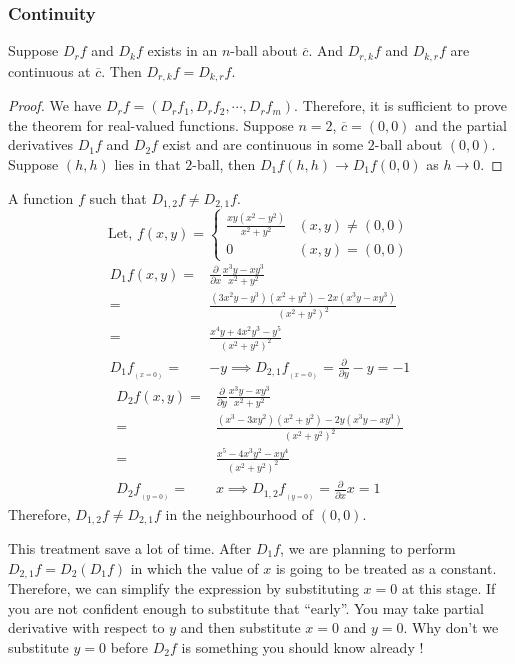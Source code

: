 \subsubsection{Continuity}
\begin{theorem}
	Suppose $D_r f$ and $D_k f$ exists in an $n$-ball about $\overline{c}$.
	And $D_{r,k} f$ and $D_{k,r} f$ are continuous at $\overline{c}$.
	Then $D_{r,k} f = D_{k,r} f$.
\end{theorem}
\begin{proof}
	We have $D_r f = (D_r f_1 , D_r f_2, \cdots, D_r f_m)$.
	Therefore, it is sufficient to prove the theorem for real-valued functions.
	Suppose $n = 2$, $\overline{c} = (0,0)$ and the partial derivatives $D_1 f$ and $D_2 f$ exist and are continuous in some $2$-ball about $(0,0)$.
	Suppose $(h,h)$ lies in that $2$-ball, then $D_1 f(h,h) \to D_1 f(0,0)$ as $h \to 0$.
\end{proof}

\begin{remark} A function $f$ such that $D_{1,2} f \ne D_{2,1} f$.
	\[ \text{Let, }f(x,y) = \begin{cases} \frac{xy(x^2-y^2)}{x^2+y^2} & (x,y) \ne (0,0) \\ 0 & (x,y) = (0,0) \end{cases} \]
	\begin{align*}
		D_1 f(x,y) = & \frac{\partial}{\partial x} \frac{x^3y-xy^3}{x^2+y^2} \\
		= & \frac{(3x^2y-y^3)(x^2+y^2) - 2x(x^3y-xy^3)}{(x^2+y^2)^2} \\
		= & \frac{x^4y+4x^2y^3-y^5}{(x^2+y^2)^2}\\
		D_1 f_{_{(x = 0)}} = & -y \implies D_{2,1} f_{_{(x = 0)}} = \frac{\partial}{\partial y} -y = -1
	\end{align*}
	\begin{align*}
		D_2 f(x,y) = & \frac{\partial}{\partial y} \frac{x^3y-xy^3}{x^2+y^2} \\
		= & \frac{(x^3-3xy^2)(x^2+y^2)-2y(x^3y-xy^3)}{(x^2+y^2)^2} \\
		= & \frac{x^5-4x^3y^2-xy^4}{(x^2+y^2)^2} \\
		D_2 f_{_{(y = 0)}} = & x \implies D_{1,2} f_{_{(y = 0)}}  = \frac{\partial}{\partial x} x = 1
	\end{align*}
	Therefore, $D_{1,2} f \ne D_{2,1} f$ in the neighbourhood of $(0,0)$.
	\begin{commentary} This treatment save a lot of time.
	After $D_1 f$, we are planning to perform $D_{2,1} f = D_2 (D_1 f)$ in which the value of $x$ is going to be treated as a constant.
	Therefore, we can simplify the expression by substituting $x = 0$ at this stage.
	If you are not confident enough to substitute that ``early''.
	You may take partial derivative with respect to $y$ and then substitute $x = 0$ and $y = 0$.
	Why don't we substitute $y = 0$ before $D_2 f$ is something you should know already !\end{commentary}
\end{remark}

